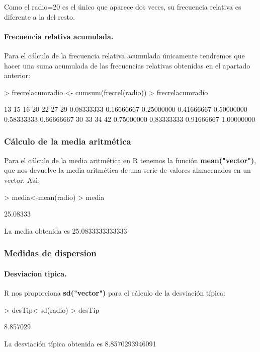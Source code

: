\documentclass [a4paper] {article}
\begin{document}
Como el radio=20 es el único que aparece dos veces, su frecuencia relativa es diferente a la del resto.

\paragraph{Frecuencia relativa acumulada.}
Para el cálculo de la frecuencia relativa acumulada únicamente tendremos que hacer una suma acumulada de
las frecuencias relativas obtenidas en el apartado anterior:
\begin{Schunk}
\begin{Sinput}
> frecrelacumradio <- cumsum(frecrel(radio))
> frecrelacumradio
\end{Sinput}
\begin{Soutput}
        13         15         16         20         22         27         29 
0.08333333 0.16666667 0.25000000 0.41666667 0.50000000 0.58333333 0.66666667 
        30         33         34         42 
0.75000000 0.83333333 0.91666667 1.00000000 
\end{Soutput}
\end{Schunk}

\subsubsection{Cálculo de la media aritmética}
Para el cálculo de la media aritmética en R tenemos la función \textbf{mean("vector")}, que
nos devuelve la media aritmética de una serie de valores almacenados en un vector. Así:
\begin{Schunk}
\begin{Sinput}
> media<-mean(radio)
> media
\end{Sinput}
\begin{Soutput}
[1] 25.08333
\end{Soutput}
\end{Schunk}

La media obtenida es 25.0833333333333

\subsubsection{Medidas de dispersion}
\paragraph{Desviacion tipica.}
R nos proporciona \textbf{sd("vector")} para el cálculo de la desviación típica:
\begin{Schunk}
\begin{Sinput}
> desTip<-sd(radio)
> desTip
\end{Sinput}
\begin{Soutput}
[1] 8.857029
\end{Soutput}
\end{Schunk}
La desviación típica obtenida es 8.8570293946091
\end{document}

